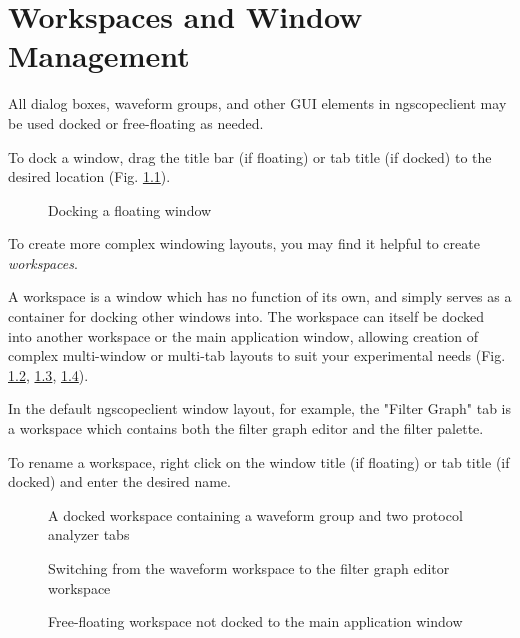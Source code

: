\chapter{Workspaces and Window Management}

All dialog boxes, waveform groups, and other GUI elements in ngscopeclient may be used docked or free-floating as
needed.

To dock a window, drag the title bar (if floating) or tab title (if docked) to the desired location (Fig.
\ref{w-docking}).

\begin{figure}[h]
\centering
{}
\caption{Docking a floating window}
\label{w-docking}
\end{figure}

To create more complex windowing layouts, you may find it helpful to create \emph{workspaces}.

A workspace is a window which has no function of its own, and simply serves as a container for docking other windows
into. The workspace can itself be docked into another workspace or the main application window, allowing creation of
complex multi-window or multi-tab layouts to suit your experimental needs (Fig. \ref{w-workspace}, \ref{w-workspace2},
\ref{w-workspace3}).

In the default ngscopeclient window layout, for example, the "Filter Graph" tab is a workspace which contains both the
filter graph editor and the filter palette.

To rename a workspace, right click on the window title (if floating) or tab title (if docked) and enter the desired
name.

\begin{figure}[h]
\centering
{}
\caption{A docked workspace containing a waveform group and two protocol analyzer tabs}
\label{w-workspace}
\end{figure}


\begin{figure}[h]
\centering
{}
\caption{Switching from the waveform workspace to the filter graph editor workspace}
\label{w-workspace2}
\end{figure}


\begin{figure}[h]
\centering
{}
\caption{Free-floating workspace not docked to the main application window}
\label{w-workspace3}
\end{figure}
